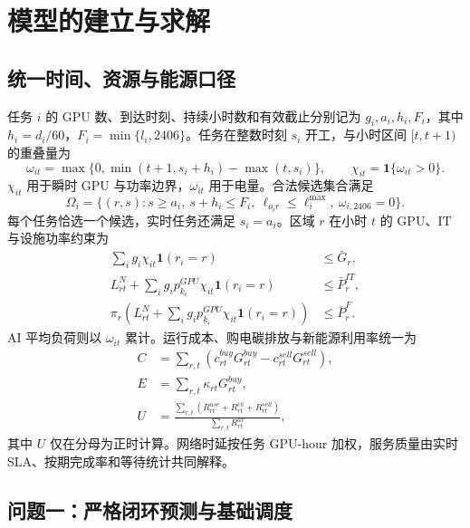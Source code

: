 \documentclass[withoutpreface,bwprint]{cumcmthesis}
\begin{document}
\section{模型的建立与求解}

\subsection{统一时间、资源与能源口径}
任务 $i$ 的 GPU 数、到达时刻、持续小时数和有效截止分别记为 $g_i,a_i,h_i,F_i$，其中 $h_i=d_i/60$，$F_i=\min\{l_i,2406\}$。任务在整数时刻 $s_i$ 开工，与小时区间 $[t,t+1)$ 的重叠量为
\begin{equation}
\omega_{it}=\max\{0,\min(t+1,s_i+h_i)-\max(t,s_i)\},\qquad
\chi_{it}=\mathbf 1\{\omega_{it}>0\}.
\end{equation}
$\chi_{it}$ 用于瞬时 GPU 与功率边界，$\omega_{it}$ 用于电量。合法候选集合满足
\begin{equation}
\Omega_i=\{(r,s):s\ge a_i,\ s+h_i\le F_i,\ \ell_{o_i r}\le \ell_i^{\max},\ \omega_{i,2406}=0\}.
\end{equation}
每个任务恰选一个候选，实时任务还满足 $s_i=a_i$。区域 $r$ 在小时 $t$ 的 GPU、IT 与设施功率约束为
\begin{align}
\sum_i g_i\chi_{it}\mathbf 1(r_i=r)&\le \bar G_r,\\
L_{rt}^{N}+\sum_i g_i p_{k_i}^{GPU}\chi_{it}\mathbf 1(r_i=r)&\le \bar P_r^{IT},\\
\pi_r\!\left(L_{rt}^{N}+\sum_i g_i p_{k_i}^{GPU}\chi_{it}\mathbf 1(r_i=r)\right)&\le \bar P_r^{F}.
\end{align}
AI 平均负荷则以 $\omega_{it}$ 累计。运行成本、购电碳排放与新能源利用率统一为
\begin{align}
C&=\sum_{r,t}(c^{buy}_{rt}G^{buy}_{rt}-c^{sell}_{rt}G^{sell}_{rt}),\\
E&=\sum_{r,t}\kappa_{rt}G^{buy}_{rt},\\
U&=\frac{\sum_{r,t}(R^{use}_{rt}+R^{ch}_{rt}+R^{sell}_{rt})}{\sum_{r,t}R^{av}_{rt}},
\end{align}
其中 $U$ 仅在分母为正时计算。网络时延按任务 GPU-hour 加权，服务质量由实时 SLA、按期完成率和等待统计共同解释。

\subsection{问题一：严格闭环预测与基础调度}
\end{document}

